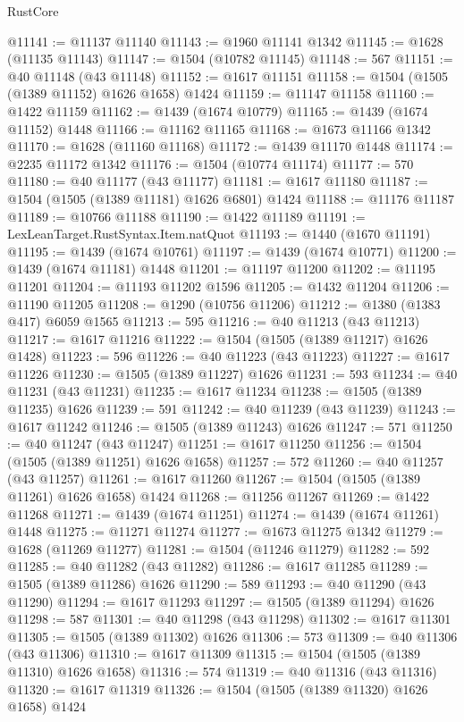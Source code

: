 \begin{lexlean}{RustCore}
\begin{coremodule}
@11141 := @11137 @11140
@11143 := @1960 @11141 @1342
@11145 := @1628 (@11135 @11143)
@11147 := @1504 (@10782 @11145)
@11148 := 567
@11151 := @40 @11148 (@43 @11148)
@11152 := @1617 @11151
@11158 := @1504 (@1505 (@1389 @11152) @1626 @1658) @1424
@11159 := @11147 @11158
@11160 := @1422 @11159
@11162 := @1439 (@1674 @10779)
@11165 := @1439 (@1674 @11152) @1448
@11166 := @11162 @11165
@11168 := @1673 @11166 @1342
@11170 := @1628 (@11160 @11168)
@11172 := @1439 @11170 @1448
@11174 := @2235 @11172 @1342
@11176 := @1504 (@10774 @11174)
@11177 := 570
@11180 := @40 @11177 (@43 @11177)
@11181 := @1617 @11180
@11187 := @1504 (@1505 (@1389 @11181) @1626 @6801) @1424
@11188 := @11176 @11187
@11189 := @10766 @11188
@11190 := @1422 @11189
@11191 := LexLeanTarget.RustSyntax.Item.natQuot
@11193 := @1440 (@1670 @11191)
@11195 := @1439 (@1674 @10761)
@11197 := @1439 (@1674 @10771)
@11200 := @1439 (@1674 @11181) @1448
@11201 := @11197 @11200
@11202 := @11195 @11201
@11204 := @11193 @11202 @1596
@11205 := @1432 @11204
@11206 := @11190 @11205
@11208 := @1290 (@10756 @11206)
@11212 := @1380 (@1383 @417) @6059 @1565
@11213 := 595
@11216 := @40 @11213 (@43 @11213)
@11217 := @1617 @11216
@11222 := @1504 (@1505 (@1389 @11217) @1626 @1428)
@11223 := 596
@11226 := @40 @11223 (@43 @11223)
@11227 := @1617 @11226
@11230 := @1505 (@1389 @11227) @1626
@11231 := 593
@11234 := @40 @11231 (@43 @11231)
@11235 := @1617 @11234
@11238 := @1505 (@1389 @11235) @1626
@11239 := 591
@11242 := @40 @11239 (@43 @11239)
@11243 := @1617 @11242
@11246 := @1505 (@1389 @11243) @1626
@11247 := 571
@11250 := @40 @11247 (@43 @11247)
@11251 := @1617 @11250
@11256 := @1504 (@1505 (@1389 @11251) @1626 @1658)
@11257 := 572
@11260 := @40 @11257 (@43 @11257)
@11261 := @1617 @11260
@11267 := @1504 (@1505 (@1389 @11261) @1626 @1658) @1424
@11268 := @11256 @11267
@11269 := @1422 @11268
@11271 := @1439 (@1674 @11251)
@11274 := @1439 (@1674 @11261) @1448
@11275 := @11271 @11274
@11277 := @1673 @11275 @1342
@11279 := @1628 (@11269 @11277)
@11281 := @1504 (@11246 @11279)
@11282 := 592
@11285 := @40 @11282 (@43 @11282)
@11286 := @1617 @11285
@11289 := @1505 (@1389 @11286) @1626
@11290 := 589
@11293 := @40 @11290 (@43 @11290)
@11294 := @1617 @11293
@11297 := @1505 (@1389 @11294) @1626
@11298 := 587
@11301 := @40 @11298 (@43 @11298)
@11302 := @1617 @11301
@11305 := @1505 (@1389 @11302) @1626
@11306 := 573
@11309 := @40 @11306 (@43 @11306)
@11310 := @1617 @11309
@11315 := @1504 (@1505 (@1389 @11310) @1626 @1658)
@11316 := 574
@11319 := @40 @11316 (@43 @11316)
@11320 := @1617 @11319
@11326 := @1504 (@1505 (@1389 @11320) @1626 @1658) @1424

\end{coremodule}
\end{lexlean}

